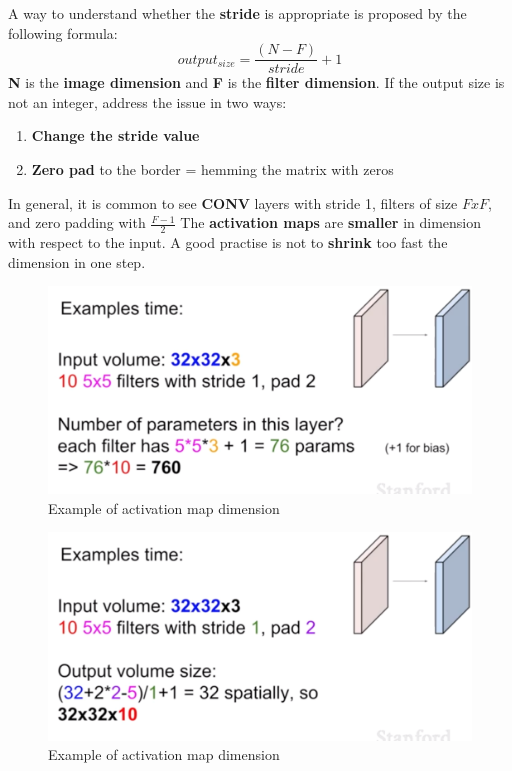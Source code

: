 \documentclass[11pt]{article}
\begin{document}
A way to understand whether the \textbf{stride } is appropriate is proposed by the following formula:
\begin{equation}
    output_{size}= \frac{(N - F)}{stride} + 1 
\end{equation}{}
\textbf{ N} is the \textbf{image dimension} and \textbf{F} is the \textbf{filter dimension}. If the output size is not an integer, address the issue in  two ways:
\begin{enumerate}
    \item \textbf{Change the stride value}
    \item \textbf{Zero pad} to the border = hemming the matrix with zeros
\end{enumerate}{}
In general, it is common to see \textbf{CONV} layers with stride 1, filters of size $FxF$, and zero padding with $\frac{F-1}{2}$
\clearpage
The \textbf{activation maps} are \textbf{smaller} in dimension with respect to the input. A good practise is not to \textbf{shrink} too fast the dimension in one step.\\
\begin{minipage}{0.5\textwidth}
\begin{figure} [H]
\centering 
\includegraphics[scale=0.28]{L415.pdf}
\caption{ Example of activation map dimension}
\label{fig:L415}
\end{figure}
\end{minipage}
\begin{minipage}{0.5\textwidth}
\begin{figure} [H]
\centering 
\includegraphics[scale=0.28]{L416.pdf}
\caption{Example of activation map dimension}
\label{fig:L416}
\end{figure}
\end{minipage}\\
\end{document}
